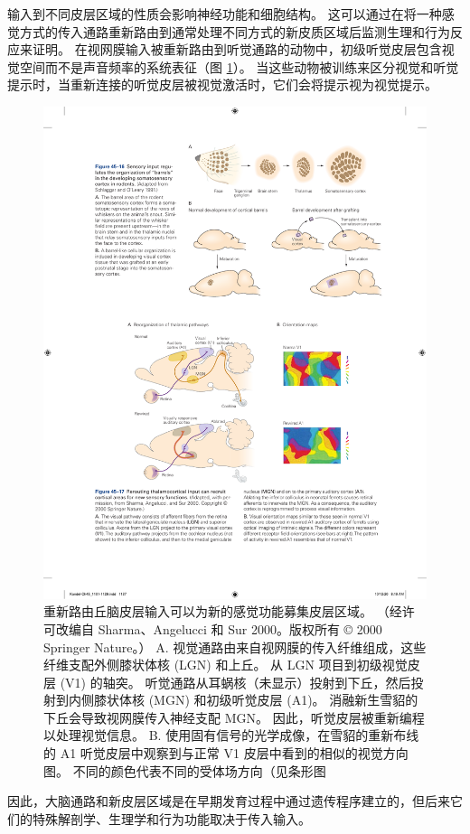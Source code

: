 输入到不同皮层区域的性质会影响神经功能和细胞结构。 这可以通过在将一种感觉方式的传入通路重新路由到通常处理不同方式的新皮质区域后监测生理和行为反应来证明。 
在视网膜输入被重新路由到听觉通路的动物中，初级听觉皮层包含视觉空间而不是声音频率的系统表征（图 \ref{fig:45_17}）。 
当这些动物被训练来区分视觉和听觉提示时，当重新连接的听觉皮层被视觉激活时，它们会将提示视为视觉提示。

\begin{figure}[htbp]
	\centering
	\includegraphics[width=0.8\linewidth]{chap45/fig_45_17}
	\caption{重新路由丘脑皮层输入可以为新的感觉功能募集皮层区域。 （经许可改编自 Sharma、Angelucci 和 Sur 2000。版权所有 © 2000 Springer Nature。） A. 视觉通路由来自视网膜的传入纤维组成，这些纤维支配外侧膝状体核 (LGN) 和上丘。 从 LGN 项目到初级视觉皮层 (V1) 的轴突。 听觉通路从耳蜗核（未显示）投射到下丘，然后投射到内侧膝状体核 (MGN) 和初级听觉皮层 (A1)。 消融新生雪貂的下丘会导致视网膜传入神经支配 MGN。 因此，听觉皮层被重新编程以处理视觉信息。 B. 使用固有信号的光学成像，在雪貂的重新布线的 A1 听觉皮层中观察到与正常 V1 皮层中看到的相似的视觉方向图。 不同的颜色代表不同的受体场方向（见条形图}
	\label{fig:45_17}
\end{figure}

因此，大脑通路和新皮层区域是在早期发育过程中通过遗传程序建立的，但后来它们的特殊解剖学、生理学和行为功能取决于传入输入。


